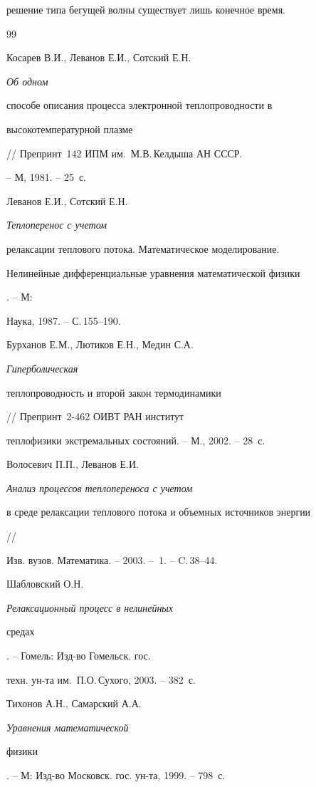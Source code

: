 решение типа бегущей волны существует лишь конечное время.








\begin{thebibliography}{99}







Косарев В.И., Леванов Е.И., Сотский Е.Н. {\em Об одном


способе описания процесса электронной теплопроводности в


высокотемпературной плазме} // Препринт \No\,142 ИПМ им.~М.В.\,Келдыша АН СССР.


-- М, 1981. -- 25~с.




Леванов Е.И., Сотский Е.Н. {\em Теплоперенос с учетом


релаксации теплового потока. Математическое моделирование.


Нелинейные дифференциальные уравнения математической физики}. -- М:


Наука, 1987. -- С.\,155--190.




Бурханов Е.М., Лютиков Е.Н., Медин С.А. {\em Гиперболическая


теплопроводность и второй закон термодинамики}


// Препринт \No\,2-462 ОИВТ РАН институт


теплофизики экстремальных состояний. -- М., 2002. -- 28~с.




Волосевич П.П., Леванов Е.И. {\em Анализ процессов теплопереноса с учетом


в среде релаксации теплового потока и объемных источников энергии} //


Изв. вузов. Математика. -- 2003. -- \No\,1. -- C.\,38--44.




Шабловский О.Н. {\em Релаксационный процесс в нелинейных


средах}. -- Гомель: Изд-во Гомельск. гос.


техн. ун-та им.~П.О.\,Сухого, 2003. -- 382~с.




Тихонов А.Н., Самарский А.А. {\em Уравнения математической


физики}. -- М: Изд-во Московск. гос. ун-та, 1999. -- 798~с.



\end{thebibliography}
